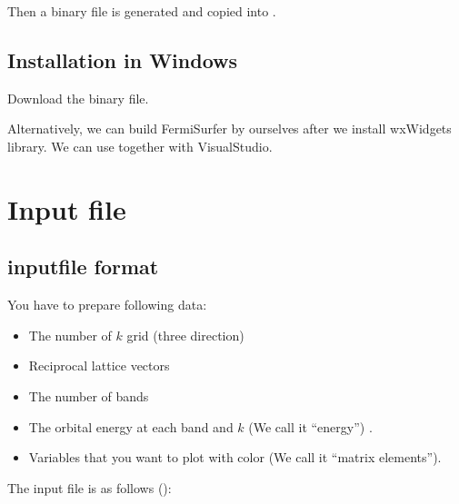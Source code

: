 \documentclass[letterpaper,10pt,pdftex,openany,english]{sphinxmanual}
\begin{document}
\sphinxAtStartPar
Then a binary file  is generated and
copied into .


\section{Installation in Windows}
\label{\detokenize{install:installation-in-windows}}
\sphinxAtStartPar
Download the binary file.

\sphinxAtStartPar
Alternatively, we can build FermiSurfer by ourselves
after we install wxWidgets library.
We can use  together with VisualStudio.


\chapter{Input file}
\label{\detokenize{input:input-file}}\label{\detokenize{input:input}}\label{\detokenize{input::doc}}

\section{input\sphinxhyphen{}file format}
\label{\detokenize{input:input-file-format}}
\sphinxAtStartPar
You have to prepare following data:
\begin{itemize}
\item {} 
\sphinxAtStartPar
The number of \(k\) grid (three direction)

\item {} 
\sphinxAtStartPar
Reciprocal lattice vectors

\item {} 
\sphinxAtStartPar
The number of bands

\item {} 
\sphinxAtStartPar
The orbital energy at each band and \(k\) (We call it “energy”) .

\item {} 
\sphinxAtStartPar
Variables that you want to plot with color (We call it “matrix
elements”).

\end{itemize}

\sphinxAtStartPar
The input file is as follows ():
\end{document}

